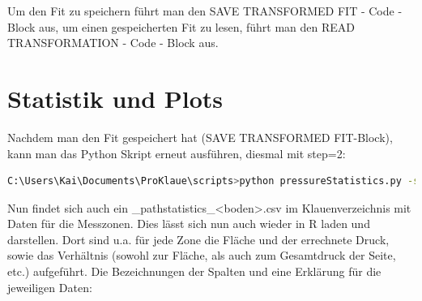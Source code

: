 \documentclass[a4paper, openany, oneside]{memoir}
\begin{document}
Um den Fit zu speichern führt man den SAVE TRANSFORMED FIT - Code - Block aus, um einen gespeicherten Fit zu lesen, führt man den READ TRANSFORMATION - Code - Block aus.



\section{Statistik und Plots} 
Nachdem man den Fit gespeichert hat (SAVE TRANSFORMED FIT-Block), kann man das Python Skript erneut ausführen, diesmal mit step=2:

\begin{minipage}[c]{\textwidth}
\begin{lstlisting}[language=bash]
C:\Users\Kai\Documents\ProKlaue\scripts>python pressureStatistics.py -s 2 -t 0.5 -b "Klaue 1 (K1T)" -g "gummi" -d "C:/Users/Kai/Documents/ProKlaue/testdaten/druck"
\end{lstlisting}
\end{minipage}


Nun findet sich auch ein \File_path{statistics_<boden>.csv} im Klauenverzeichnis mit Daten für die Messzonen. Dies lässt sich nun auch wieder in R laden und darstellen. Dort sind u.a. für jede Zone die Fläche und der errechnete Druck, sowie das Verhältnis (sowohl zur Fläche, als auch zum Gesamtdruck der Seite, etc.) aufgeführt. Die Bezeichnungen der Spalten und eine Erklärung für die jeweiligen Daten:\\\\
\end{document}
